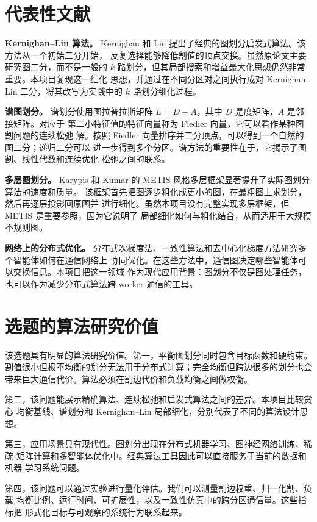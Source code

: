 \documentclass[UTF8, 11pt]{ctexart}
\begin{document}
\section{代表性文献}

\textbf{Kernighan--Lin 算法。}
Kernighan 和 Lin 提出了经典的图划分启发式算法。该方法从一个初始二分开始，
反复选择能够降低割值的顶点交换。虽然原论文主要研究图二分，而不是一般的
$k$ 路划分，但其局部搜索和增益最大化思想仍然非常重要。本项目复现这一细化
思想，并通过在不同分区对之间执行成对 Kernighan--Lin 二分，将其改写为实践中的
$k$ 路划分细化过程。

\textbf{谱图划分。}
谱划分使用图拉普拉斯矩阵 $L=D-A$，其中 $D$ 是度矩阵，$A$ 是邻接矩阵。对应于
第二小特征值的特征向量称为 Fiedler 向量，它可以看作某种图割问题的连续松弛
解。按照 Fiedler 向量排序并二分顶点，可以得到一个自然的图二分；递归二分可以
进一步得到多个分区。谱方法的重要性在于，它揭示了图割、线性代数和连续优化
松弛之间的联系。

\textbf{多层图划分。}
Karypis 和 Kumar 的 METIS 风格多层框架显著提升了实际图划分算法的速度和质量。
该框架首先把图逐步粗化成更小的图，在最粗图上求划分，然后再逐层投影回原图并
进行细化。虽然本项目没有完整实现多层框架，但 METIS 是重要参照，因为它说明了
局部细化如何与粗化结合，从而适用于大规模不规则图。

\textbf{网络上的分布式优化。}
分布式次梯度法、一致性算法和去中心化梯度方法研究多个智能体如何在通信网络上
协同优化。在这些方法中，通信图决定哪些智能体可以交换信息。本项目把这一领域
作为现代应用背景：图划分不仅是图处理任务，也可以作为减少分布式算法跨 worker
通信的工具。

\section{选题的算法研究价值}

该选题具有明显的算法研究价值。第一，平衡图划分同时包含目标函数和硬约束。
割值很小但极不均衡的划分无法用于分布式计算；完全均衡但跨边很多的划分也会
带来巨大通信代价。算法必须在割边代价和负载均衡之间做权衡。

第二，该问题能展示精确算法、连续松弛和启发式算法之间的差异。本项目比较贪心
均衡基线、谱划分和 Kernighan--Lin 局部细化，分别代表了不同的算法设计思想。

第三，应用场景具有现代性。图划分出现在分布式机器学习、图神经网络训练、稀疏
矩阵计算和多智能体优化中。经典算法工具因此可以直接服务于当前的数据和机器
学习系统问题。

第四，该问题可以通过实验进行量化评估。我们可以测量割边权重、归一化割、负载
均衡比例、运行时间、可扩展性，以及一致性仿真中的跨分区通信量。这些指标把
形式化目标与可观察的系统行为联系起来。
\end{document}
